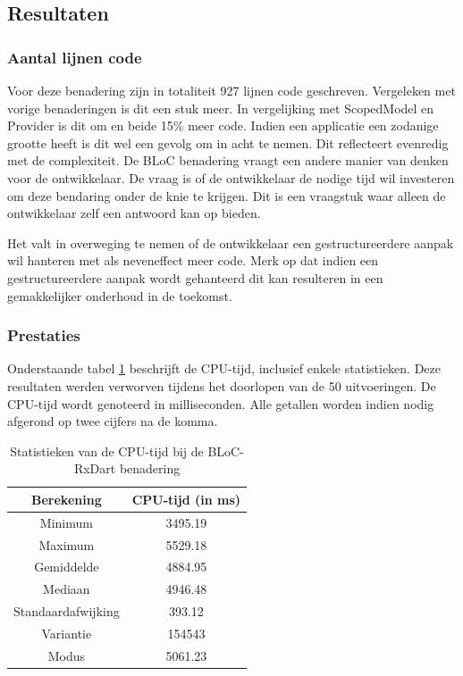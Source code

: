 \subsection{Resultaten}
\subsubsection{Aantal lijnen code}
Voor deze benadering zijn in totaliteit 927 lijnen code geschreven. Vergeleken met vorige benaderingen is dit een stuk meer. In vergelijking met ScopedModel en Provider is dit om en beide 15\% meer code. Indien een applicatie een zodanige grootte heeft is dit wel een gevolg om in acht te nemen. Dit reflecteert evenredig met de complexiteit. De BLoC benadering vraagt een andere manier van denken voor de ontwikkelaar. De vraag is of de ontwikkelaar de nodige tijd wil investeren om deze bendaring onder de knie te krijgen. Dit is een vraagstuk waar alleen de ontwikkelaar zelf een antwoord kan op bieden.

Het valt in overweging te nemen of de ontwikkelaar een gestructureerdere aanpak wil hanteren met als neveneffect meer code. Merk op dat indien een gestructureerdere aanpak wordt gehanteerd dit kan resulteren in een gemakkelijker onderhoud in de toekomst. 
\subsubsection{Prestaties}
Onderstaande tabel \ref{table:experiment-bloc-rxdart-statistics} beschrijft de CPU-tijd, inclusief enkele statistieken. Deze resultaten werden verworven tijdens het doorlopen van de 50 uitvoeringen. De CPU-tijd wordt genoteerd in milliseconden. Alle getallen worden indien nodig afgerond op twee cijfers na de komma.
\begin{table}[H]
    \centering
    \begin{tabular}{c|c}
        \textbf{Berekening} & \textbf{CPU-tijd (in ms)}  \\ \hline
        Minimum             & 3495.19                    \\ \hline
        Maximum             & 5529.18                    \\ \hline
        Gemiddelde          & 4884.95                    \\ \hline
        Mediaan             & 4946.48                    \\ \hline
        Standaardafwijking  & 393.12                     \\ \hline
        Variantie           & 154543                     \\ \hline
        Modus               & 5061.23                      \\                
    \end{tabular}
    \caption{Statistieken van de CPU-tijd bij de BLoC-RxDart benadering}
    \label{table:experiment-bloc-rxdart-statistics}
\end{table}

